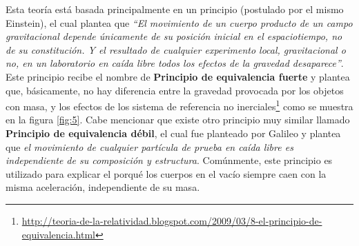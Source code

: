 Esta teoría está basada principalmente en un principio (postulado por el mismo Einstein), el cual plantea que \textit{``El movimiento de un cuerpo producto de un campo gravitacional depende únicamente de su posición inicial en el espaciotiempo, no de su constitución. Y el resultado de cualquier experimento local, gravitacional o no, en un laboratorio en caída libre todos los efectos de la gravedad desaparece''}. Este principio recibe el nombre de \textbf{Principio de equivalencia fuerte} y plantea que, básicamente, no hay diferencia entre la gravedad provocada por los objetos con masa, y los efectos de los sistema de referencia no inerciales\footnote{\url{http://teoria-de-la-relatividad.blogspot.com/2009/03/8-el-principio-de-equivalencia.html}} como se muestra en la figura \ref{fig:5}. Cabe mencionar que existe otro principio muy similar llamado \textbf{Principio de equivalencia débil}, el cual fue planteado por Galileo y plantea que \textit{el movimiento de cualquier partícula de prueba en caída libre es independiente de su composición y estructura}. Comúnmente, este principio es utilizado para explicar el porqué los cuerpos en el vacío siempre caen con la misma aceleración, independiente de su masa.
